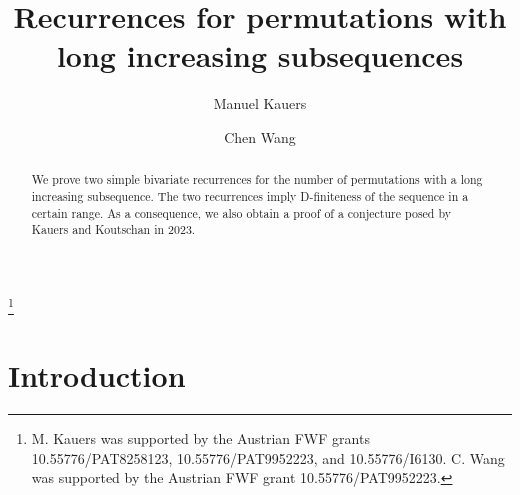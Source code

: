 \documentclass[a4paper,draft]{amsart}
\begin{document}
\author[Manuel Kauers]{Manuel Kauers}
\address{Manuel Kauers, Institute for Algebra, J. Kepler University Linz, Austria}

\author[Chen Wang]{Chen Wang}
\address{Chen Wang, Institute for Algebra, J. Kepler University Linz, Austria}

\thanks{M. Kauers was supported by the Austrian FWF grants 10.55776/PAT8258123, 10.55776/PAT9952223,
  and 10.55776/I6130. C. Wang was supported by the Austrian FWF grant 10.55776/PAT9952223.}

\title{Recurrences for permutations with long increasing subsequences}

\begin{abstract}
  We prove two simple bivariate recurrences for the number of permutations with a long increasing subsequence.
  The two recurrences imply D-finiteness of the sequence in a certain range.
  As a consequence, we also obtain a proof of a conjecture posed by Kauers and Koutschan in 2023.
\end{abstract}

\maketitle

\section{Introduction}
\end{document}
